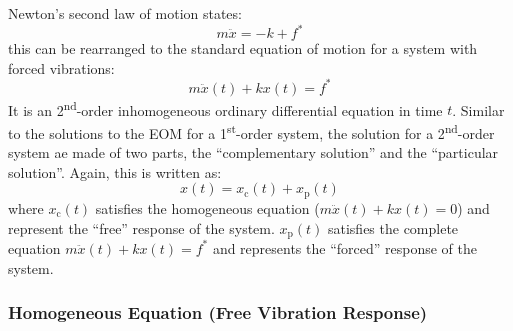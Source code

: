 \documentclass[12pt,letter]{article}
\begin{document}
Newton's second law of motion states:
\begin{equation}
m \ddot{x} = -k + f^*
\end{equation}
this can be rearranged to the standard equation of motion for a system with forced vibrations:
\begin{equation}
m \ddot{x}(t) + kx(t) = f^*
\label{eq:EOM_2nd}
\end{equation}
It is an 2\textsuperscript{nd}-order inhomogeneous ordinary differential equation in time $t$.  Similar to the solutions to the EOM for a 1\textsuperscript{st}-order system, the solution for a 2\textsuperscript{nd}-order system ae made of two parts, the ``complementary solution'' and the ``particular solution''. Again, this is written as:
\begin{equation}
x(t) = x_\text{c}(t)+x_\text{p}(t)
\end{equation}
where $x_\text{c}(t)$ satisfies the homogeneous equation ($m \ddot{x}(t) + kx(t) = 0$) and represent the ``free'' response of the system. $x_\text{p}(t)$ satisfies the complete equation $m \ddot{x}(t) + kx(t) = f^*$ and represents the ``forced'' response of the system.


\subsubsection{Homogeneous Equation (Free Vibration Response)}
\end{document}
